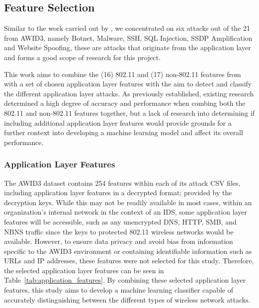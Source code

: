 

\subsection{Feature Selection}

Similar to the work carried out by \parencite{s22155633}, we concentrated on six attacks out of the 21 from AWID3, namely Botnet, Malware, SSH, SQL Injection, SSDP Amplification and Website Spoofing, these are attacks that originate from the application layer and forms a good scope of research for this project. 

This work aims to combine the (16) 802.11 and (17) non-802.11 features from \parencite{s22155633} with a set of chosen application layer features with the aim to detect and classify the different application layer attacks. As previously established, existing research determined a high degree of accuracy and performance when combing both the 802.11 and non-802.11 features together, but a lack of research into determining if including additional application layer features would provide grounds for a further context into developing a machine learning model and affect its overall performance.

\subsubsection{Application Layer Features}

The AWID3 dataset contains 254 features within each of its attack CSV files, including application layer features in a decrypted format; provided by the decryption keys. While this may not be readily available in most cases, within an organization's internal network in the context of an IDS, some application layer features will be accessible, such as any unencrypted DNS, HTTP, SMB, and NBNS traffic since the keys to protected 802.11 wireless networks would be available. However, to ensure data privacy and avoid bias from information specific to the AWID3 environment or containing identifiable information such as URLs and IP addresses, these features were not selected for this study. Therefore, the selected application layer features can be seen in Table~\ref{tab:application_features}. By combining these selected application layer features, this study aims to develop a machine learning classifier capable of accurately distinguishing between the different types of wireless network attacks.

